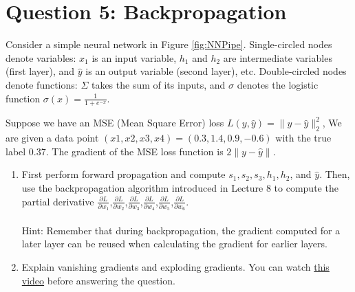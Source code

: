 \documentclass[12pt]{article}
\begin{document}
\section*{Question 5: Backpropagation }
Consider a simple neural network in Figure \ref{fig:NNPipe}. Single-circled nodes denote variables: $x_1$ is an input variable, $h_1$ and $h_2$ are intermediate variables (first layer), and $\hat{y}$ is an output variable (second layer), etc. Double-circled nodes denote functions: $\Sigma$ takes the sum of its inputs, and $\sigma$ denotes the logistic function $\sigma(x)=\frac{1}{1+e^{-x}}$.

Suppose we have an MSE (Mean Square Error) loss $L(y,\hat{y})=\lVert y-\hat{y}\rVert^{2}_{2}$, We are given a data point $(x1, x2, x3, x4) = (0.3, 1.4, 0.9, -0.6)$ with the true label 0.37. The gradient of the MSE loss function is $2\lVert y-\hat{y}\rVert$.

\begin{enumerate}
\item First perform forward propagation and compute $s_1, s_2, s_3, h_1, h_2$, and $\hat{y}$. Then, use the backpropagation algorithm introduced in Lecture 8 to compute the partial derivative $\frac{\partial L}{\partial w_1}$,$\frac{\partial L}{\partial w_2}$,$\frac{\partial L}{\partial w_3}$,$\frac{\partial L}{\partial w_4}$,$\frac{\partial L}{\partial w_5}$,$\frac{\partial L}{\partial w_6}$. \\\\
Hint: Remember that during backpropagation, the gradient computed for a later layer can be reused when calculating the gradient for earlier layers. \\

\item Explain vanishing gradients and exploding gradients. You can watch  \href{https://www.youtube.com/watch?v=qhXZsFVxGKo}{\textcolor{dkgreen}{this video}} before answering the question. 

\end{enumerate}
\end{document}
